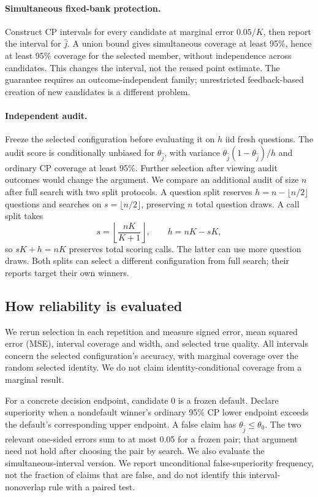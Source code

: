 \paragraph{Simultaneous fixed-bank protection.}
Construct CP intervals for every candidate at marginal error $0.05/K$, then report the interval for $\hat j$. A union bound gives simultaneous coverage at least 95\%, hence at least 95\% coverage for the selected member, without independence across candidates. This changes the interval, not the reused point estimate. The guarantee requires an outcome-independent family; unrestricted feedback-based creation of new candidates is a different problem.

\paragraph{Independent audit.}
Freeze the selected configuration before evaluating it on $h$ iid fresh questions. The audit score is conditionally unbiased for $\theta_{\hat j}$, with variance $\theta_{\hat j}(1-\theta_{\hat j})/h$ and ordinary CP coverage at least 95\%. Further selection after viewing audit outcomes would change the argument. We compare an additional audit of size $n$ after full search with two split protocols. A question split reserves $h=n-\lfloor n/2\rfloor$ questions and searches on $s=\lfloor n/2\rfloor$, preserving $n$ total question draws. A call split takes
\begin{equation}
 s=\left\lfloor\frac{nK}{K+1}\right\rfloor,\qquad h=nK-sK,
\end{equation}
so $sK+h=nK$ preserves total scoring calls. The latter can use more question draws. Both splits can select a different configuration from full search; their reports target their own winners.

\subsection{How reliability is evaluated}
We rerun selection in each repetition and measure signed error, mean squared error (MSE), interval coverage and width, and selected true quality. All intervals concern the selected configuration's accuracy, with marginal coverage over the random selected identity. We do not claim identity-conditional coverage from a marginal result.

For a concrete decision endpoint, candidate 0 is a frozen default. Declare superiority when a nondefault winner's ordinary 95\% CP lower endpoint exceeds the default's corresponding upper endpoint. A false claim has $\theta_{\hat j}\leq\theta_0$. The two relevant one-sided errors sum to at most 0.05 for a frozen pair; that argument need not hold after choosing the pair by search. We also evaluate the simultaneous-interval version. We report unconditional false-superiority frequency, not the fraction of claims that are false, and do not identify this interval-nonoverlap rule with a paired test.


